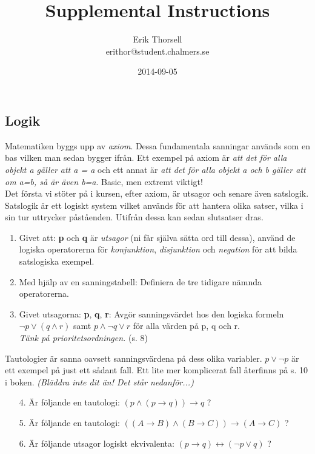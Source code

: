 \documentclass{article}
\title{Supplemental Instructions}
\author{Erik Thorsell \\ 
		\small{erithor@student.chalmers.se}
}
\date{2014-09-05}
\begin{document}
\maketitle

\subsection*{Logik}
Matematiken byggs upp av {\it axiom}. Dessa fundamentala sanningar används som en bas vilken man sedan bygger ifrån. Ett exempel på axiom är {\it att det för alla objekt a gäller att a = a} och ett annat är {\it att det för alla objekt a och b gäller att om a=b, så är även b=a}. Basic, men extremt viktigt!\\
Det första vi stöter på i kursen, efter axiom, är utsagor och senare även satslogik. Satslogik är ett logiskt system vilket används för att hantera olika satser, vilka i sin tur uttrycker påståenden. Utifrån dessa kan sedan slutsatser dras.
 
\begin{enumerate}
\item  Givet att: {\bf p} och {\bf q} är {\it utsagor} (ni får själva sätta ord till dessa), använd de logiska operatorerna för {\it konjunktion}, {\it disjunktion} och {\it negation} för att bilda satslogiska exempel.
\item Med hjälp av en sanningstabell: Definiera de tre tidigare nämnda operatorerna.
\item Givet utsagorna: {\bf p}, {\bf q}, {\bf r}: Avgör sanningsvärdet hos den logiska formeln $\neg p \lor (q \land r)$ samt $p \land \neg q \lor r$ för alla värden på p, q och r. \\
{\it Tänk på prioritetsordningen.} (s. 8)
\end{enumerate}

Tautologier är sanna oavsett sanningsvärdena på dess olika variabler. $p \lor \neg p$ är ett exempel på just ett sådant fall. Ett lite mer komplicerat fall återfinns på s. 10 i boken. {\it (Bläddra inte dit än! Det står nedanför...)}

\begin{enumerate}
\item[4.] Är följande en tautologi: $(p \land (p \rightarrow q)) \rightarrow q$ ?
\item[5.] Är följande en tautologi: $((A \rightarrow B) \land (B \rightarrow C)) \rightarrow (A \rightarrow C)$ ?
\item[6.] Är följande utsagor logiskt ekvivalenta: $(p \rightarrow q) \leftrightarrow (\neg p \lor q)$ ?
\end{enumerate}
\end{document}
